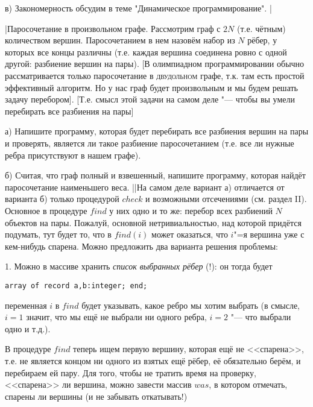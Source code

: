 в) Закономерность обсудим в теме "Динамическое программирование".
|

\task|Паросочетание в произвольном графе. Рассмотрим граф с $2N$ (т.е. чётным) 
количеством вершин. Паросочетанием в нем назовём набор из $N$ рёбер, у которых все 
концы различны (т.е. каждая вершина соединена ровно с одной другой: разбиение 
вершин на пары). [В олимпиадном программировании обычно рассматривается только 
паросочетание в \textsc{двудольном} графе, т.к. там есть простой эффективный алгоритм. 
Но у нас граф будет произвольным и мы будем решать задачу перебором]. 
[Т.е. смысл этой задачи на самом деле "--- чтобы вы умели перебирать все 
разбиения на пары]\par
а) Напишите программу, которая будет перебирать все разбиения вершин на пары и 
проверять, является ли такое разбиение паросочетанием (т.е. все ли нужные ребра 
присутствуют в нашем графе).\par
б) Считая, что граф полный и взвешенный, напишите программу, которая найдёт 
паросочетание наименьшего веса.
||На самом деле вариант а) отличается от варианта б) только процедурой $check$ и 
возможными отсечениями (см. раздел II). Основное в процедуре $find$ у них одно и то же: перебор 
всех разбиений $N$ объектов на пары. Пожалуй, основной нетривиальностью, над которой придётся подумать, тут будет то, что
в $find(i)$ может оказаться, что $i$"=я вершина уже с кем-нибудь спарена. Можно 
предложить два варианта решения проблемы:\par
1. Можно в массиве хранить \textit{список выбранных рёбер} (!): он тогда будет 
\begin{codesampleo}\begin{verbatim}
array of record a,b:integer; end;
\end{verbatim}
\end{codesampleo}
переменная $i$ в $find$ будет указывать, какое ребро мы хотим выбрать (в смысле, $i=1$ 
значит, что мы ещё не выбрали ни одного ребра, $i=2$ "--- что выбрали одно и 
т.д.). 

В процедуре $find$ теперь ищем первую вершину, которая ещё не <<спарена>>, т.е. не 
является концом ни одного из взятых ещё рёбер, её обязательно берём, и 
перебираем ей пару. Для того, чтобы не тратить время на проверку, <<спарена>> ли 
вершина, можно завести массив $was$, в котором отмечать, спарены ли вершины (и не 
забывать откатывать!)

